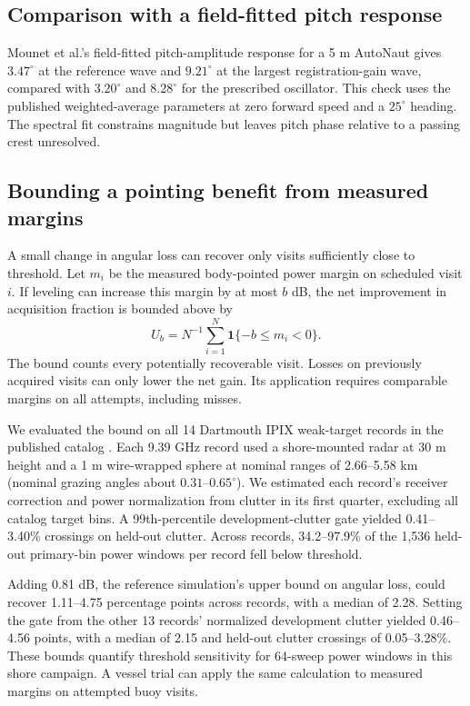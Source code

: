 \subsection{Comparison with a field-fitted pitch response}

Mounet et al.'s field-fitted pitch-amplitude response for a 5 m AutoNaut \cite{Mounet2024Hydrodynamic} gives $3.47^\circ$ at the reference wave and $9.21^\circ$ at the largest registration-gain wave, compared with $3.20^\circ$ and $8.28^\circ$ for the prescribed oscillator. This check uses the published weighted-average parameters at zero forward speed and a $25^\circ$ heading. The spectral fit constrains magnitude but leaves pitch phase relative to a passing crest unresolved.

\subsection{Bounding a pointing benefit from measured margins}
A small change in angular loss can recover only visits sufficiently close to threshold. Let $m_i$ be the measured body-pointed power margin on scheduled visit $i$. If leveling can increase this margin by at most $b$ dB, the net improvement in acquisition fraction is bounded above by
\begin{equation}
 U_b=N^{-1}\sum_{i=1}^N \mathbf{1}\{-b\le m_i<0\}.
\end{equation}
The bound counts every potentially recoverable visit. Losses on previously acquired visits can only lower the net gain. Its application requires comparable margins on all attempts, including misses.

We evaluated the bound on all 14 Dartmouth IPIX weak-target records in the published catalog \cite{McMaster1993IPIX}. Each 9.39 GHz record used a shore-mounted radar at 30 m height and a 1 m wire-wrapped sphere at nominal ranges of 2.66--5.58 km (nominal grazing angles about $0.31$--$0.65^\circ$). We estimated each record's receiver correction and power normalization from clutter in its first quarter, excluding all catalog target bins. A 99th-percentile development-clutter gate yielded 0.41--3.40\% crossings on held-out clutter. Across records, 34.2--97.9\% of the 1,536 held-out primary-bin power windows per record fell below threshold.

Adding 0.81 dB, the reference simulation's upper bound on angular loss, could recover 1.11--4.75 percentage points across records, with a median of 2.28. Setting the gate from the other 13 records' normalized development clutter yielded 0.46--4.56 points, with a median of 2.15 and held-out clutter crossings of 0.05--3.28\%. These bounds quantify threshold sensitivity for 64-sweep power windows in this shore campaign. A vessel trial can apply the same calculation to measured margins on attempted buoy visits.
